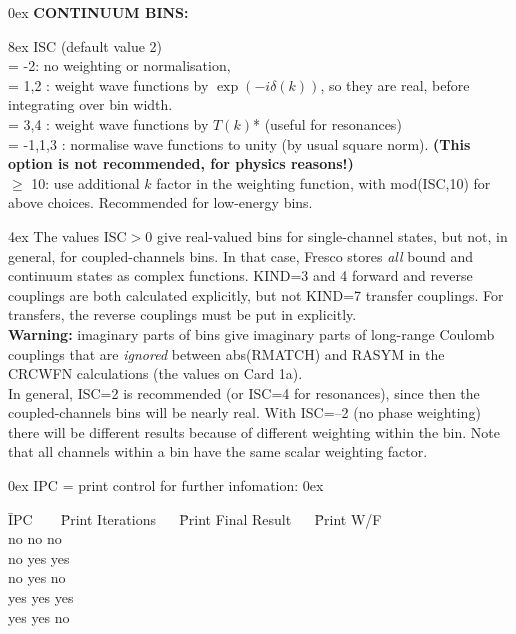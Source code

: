 \documentclass[11pt]{article}
\begin{document}
\bigskip
%
\hangindent 0ex
{\bf CONTINUUM BINS:}


\hangindent 8ex  ISC   (default value 2)\\
      = -2: no weighting or normalisation,
\\  = 1,2 : weight wave functions by $\exp(-i\delta(k))$,
so they are real, before integrating over bin width.
\\  = 3,4 : weight wave functions by $T(k)$* (useful for resonances)
\\  = -1,1,3 : normalise wave functions to unity (by usual square norm).
{\bf (This option is not recommended, for physics reasons!)}
\\  $\geq$ 10: use additional $k$ factor in the weighting function, with
mod(ISC,10) for above choices. Recommended for low-energy  bins.

\hangindent 4ex
The values ISC$>$0 give real-valued bins for single-channel states,
but not, in general, for coupled-channels bins. In that case, Fresco stores
{\em all} bound and continuum states as complex functions.
KIND=3 and 4 forward and reverse couplings are both calculated
explicitly, but not KIND=7 transfer couplings. For transfers, the
reverse couplings must be put in explicitly.\\
{\bf Warning:} imaginary parts of bins give imaginary parts of long-range
Coulomb couplings that are {\em ignored} between abs(RMATCH) and RASYM
in the CRCWFN calculations (the values on Card 1a).\\
In general, ISC=2 is recommended (or ISC=4 for resonances), since then
the coupled-channels bins will be nearly real. With ISC=--2 (no phase weighting)
there will be  different results because of different weighting within the
bin. Note that all channels within a bin have the same scalar
weighting factor.



\bigskip

%
\hangindent 0ex
IPC = print control for further infomation:
%
\hangindent 0ex

\begin{tabbing}
\=IPC ~ ~ \=Print Iterations~ ~ \=Print Final Result ~ ~\=Print W/F\\
  \>no \>no \>no\\
  \>no \>yes \>yes\\
  \>no \>yes \>no\\
  \>yes \>yes \>yes\\
  \>yes \>yes \>no\\
\end{tabbing}
\end{document}
